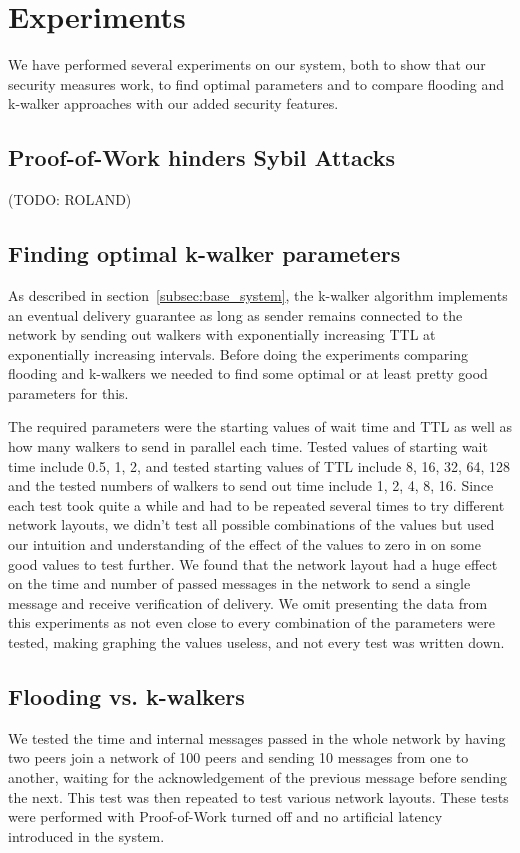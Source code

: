 \section{Experiments}
We have performed several experiments on our system, both to show that our security measures work, to find optimal parameters and to compare flooding and k-walker approaches with our added security features.

\subsection{Proof-of-Work hinders Sybil Attacks}
(TODO: ROLAND)

\subsection{Finding optimal k-walker parameters}
As described in section~\ref{subsec:base_system}, the k-walker algorithm implements an eventual delivery guarantee as long as sender remains connected to the network by sending out walkers with exponentially increasing TTL at exponentially increasing intervals. Before doing the experiments comparing flooding and k-walkers we needed to find some optimal or at least pretty good parameters for this.

The required parameters were the starting values of wait time and TTL as well as how many walkers to send in parallel each time. Tested values of starting wait time include 0.5, 1, 2, and tested starting values of TTL include 8, 16, 32, 64, 128 and the tested numbers of walkers to send out time include 1, 2, 4, 8, 16. Since each test took quite a while and had to be repeated several times to try different network layouts, we didn't test all possible combinations of the values but used our intuition and understanding of the effect of the values to zero in on some good values to test further. We found that the network layout had a huge effect on the time and number of passed messages in the network to send a single message and receive verification of delivery. We omit presenting the data from this experiments as not even close to every combination of the parameters were tested, making graphing the values useless, and not every test was written down.


\subsection{Flooding vs. k-walkers}
We tested the time and internal messages passed in the whole network by having two peers join a network of 100 peers and sending 10 messages from one to another, waiting for the acknowledgement of the previous message before sending the next. This test was then repeated to test various network layouts. These tests were performed with Proof-of-Work turned off and no artificial latency introduced in the system.

